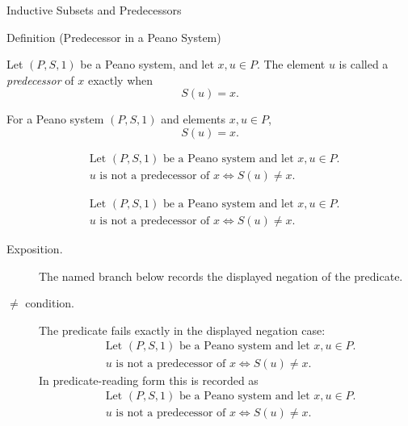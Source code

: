 \begin{topicbox}{Inductive Subsets and Predecessors}
\begin{definitionbox}{Definition (Predecessor in a Peano System)}
\begin{definition}
\label{def:predecessor-in-peano-system}
Let $(P,S,1)$ be a Peano system, and let $x,u \in P$. The element $u$ is
called a \emph{predecessor} of $x$ exactly when
\[
S(u)=x.
\]
\end{definition}
\end{definitionbox}

\begin{remark*}
For a Peano system $(P,S,1)$ and elements $x,u\in P$,
\[
S(u)=x.
\]
\end{remark*}

\begin{remark*}
\[
\begin{aligned}
&\text{Let } (P,S,1) \text{ be a Peano system and let } x,u \in P.\\
&u \text{ is not a predecessor of } x
\Longleftrightarrow
S(u) \neq x.
\end{aligned}
\]
\end{remark*}

\begin{remark*}
\[
\begin{aligned}
&\text{Let } (P,S,1) \text{ be a Peano system and let } x,u \in P.\\
&u \text{ is not a predecessor of } x
\Longleftrightarrow
S(u) \neq x.
\end{aligned}
\]
\end{remark*}

\begin{remark*}
\begin{description}
  \item[Exposition.] The named branch below records the displayed negation of the predicate.
  \item[\(\neq\) condition.] The predicate fails exactly in the displayed negation case:
  \[
  \begin{aligned}
  &\text{Let } (P,S,1) \text{ be a Peano system and let } x,u \in P.\\
  &u \text{ is not a predecessor of } x
  \Longleftrightarrow
  S(u) \neq x.
  \end{aligned}
  \]
  In predicate-reading form this is recorded as
  \[
  \begin{aligned}
  &\text{Let } (P,S,1) \text{ be a Peano system and let } x,u \in P.\\
  &u \text{ is not a predecessor of } x
  \Longleftrightarrow
  S(u) \neq x.
  \end{aligned}
  \]
\end{description}
\end{remark*}


\end{topicbox}
